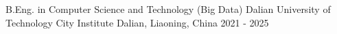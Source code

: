 
\begin{cventries}

  \cventry
    {B.Eng. in Computer Science and Technology (Big Data)}
    {Dalian University of Technology City Institute}
    {Dalian, Liaoning, China}
    {2021 - 2025}
    {}

\end{cventries}
